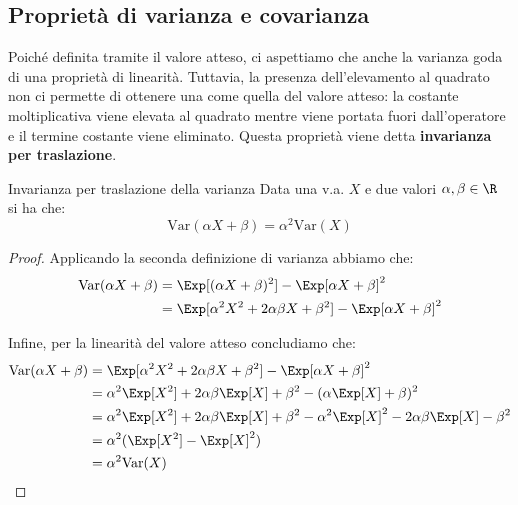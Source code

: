 \documentclass[a4paper, 12pt]{report}
\begin{document}
    

    \subsection{Proprietà di varianza e covarianza}

    Poiché definita tramite il valore atteso, ci aspettiamo che anche la varianza goda di una proprietà di linearità. Tuttavia, la presenza dell'elevamento al quadrato non ci permette di ottenere una  come quella del valore atteso: la costante moltiplicativa viene elevata al quadrato mentre viene portata fuori dall'operatore e il termine costante viene eliminato. Questa proprietà viene detta \textbf{invarianza per traslazione}.

    \begin{framedthm}{Invarianza per traslazione della varianza}
        Data una v.a. $X$ e due valori $\alpha, \beta \in \R$ si ha che:
        \[\mathrm{Var}(\alpha X + \beta) = \alpha^2 \mathrm{Var}(X)\]
    \end{framedthm}

    \begin{proof}
        Applicando la seconda definizione di varianza abbiamo che:
        \[\begin{split}
            \mathrm{Var}(\alpha X+\beta) &= \Exp[(\alpha X + \beta)^2] - \Exp[\alpha X + \beta]^2 \\
            &= \Exp[\alpha^2 X^2 + 2 \alpha \beta X + \beta^2] - \Exp[\alpha X + \beta]^2 \\
        \end{split}\]

        Infine, per la linearità del valore atteso concludiamo che:
        \[\begin{split}
            \mathrm{Var}(\alpha X + \beta) &= \Exp[\alpha^2 X^2 + 2 \alpha \beta X + \beta^2] - \Exp[\alpha X + \beta]^2 \\
            &= \alpha^2 \Exp[X^2] + 2 \alpha \beta \Exp[X] + \beta^2 - (\alpha \Exp[X] + \beta)^2 \\
            &= \alpha^2 \Exp[X^2] + 2 \alpha \beta \Exp[X] + \beta^2 - \alpha^2 \Exp[X]^2 - 2\alpha \beta \Exp[X] - \beta^2 \\
            &= \alpha^2 (\Exp[X^2] - \Exp[X]^2) \\
            &= \alpha^2 \mathrm{Var}(X) \\
        \end{split}\]
    \end{proof}
\end{document}
